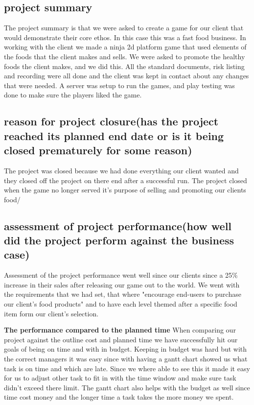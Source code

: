 \documentclass{article}
\begin{document}
\subsection{project summary}
The project summary is that we were asked to create a game for our client that would demonstrate their core ethos. In this case this was a fast food business. In working with the client we made a ninja 2d platform game that used elements of the foods that the client makes and sells.
We were asked to promote the healthy foods the client makes, and we did this. 
All the standard documents, risk listing and recording were all done and the client was kept in contact about any changes that were needed.
A server was setup to run the games, and play testing was done to make sure the players liked the game.


\subsection{reason for project closure(has the project reached its planned end date or is it being closed prematurely for some reason)}
The project was closed because we had done everything our client wanted and they closed off the project on there end after a successful run. The project closed when the game no longer served it's purpose of selling and promoting our clients food/


\subsection{assessment of project performance(how well did the project perform against the business case)}
Assessment of the project performance went well since our clients since a 25\% increase in their sales after releasing our game out to the world. We went with the requirements that we had set, that where "encourage end-users to purchase our client's food products" and to have each level themed after a specific food item form our client's selection. 

\textbf{The performance compared to the planned time } 
When comparing our project against the outline cost and planned time we have successfully hit our goals of being on time and with in budget. Keeping in budget was hard but with the correct managers it was easy since with having a gantt chart showed us what task is on time and which are late. Since we where able to see this it made it easy for us to adjust other task to fit in with the time window and make sure task didn't exceed there limit. The gantt chart also helps with the budget as well since time cost money and the longer time a task takes the more money we spent.
\end{document}
